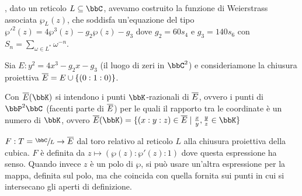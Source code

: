 
, dato un reticolo $L \subseteq \bbC$, avevamo
costruito la funzione di Weierstrass associata $\wp_L (z)$, che soddisfa
un'equazione del tipo $\wp'^2(z) = 4 \wp^3(z) - g_2 \wp(z) - g_3$ dove
$g_2 = 60 s_4$ e $g_3 = 140 s_6$ con $S_n = \sum_{\omega \in L^*}
\omega^{-n}$.

Sia $E: y^2 = 4x^3 - g_2 x - g_3$ (il luogo di zeri in $\bbC^2$) e
consideriamone la chiusura proiettiva $\overline{E} = E \cup \{ (0 : 1 : 0)
\}$.

\begin{notazione}
  Con $\ol{E}(\bbK)$ si intendono i punti $\bbK$-razionali di $\overline{E}$,
  ovvero i punti di $\bbP^2 \bbC$ (facenti parte di $\overline{E}$) per le
  quali il rapporto tra le coordinate è un numero di $\bbK$, ovvero
  $\ol{E}(\bbK) = \{ (x : y : z) \in \ol{E} \mid \frac{x}{y},
  \frac{y}{z} \in \bbK \}$
\end{notazione}

 $F: T = \sfrac{\bbC}{L} \rar \ol{E}$
dal toro relativo al reticolo $L$ alla chiusura proiettiva della
cubica. $F$ è definita da $z \mapsto (\wp(z) : \wp'(z) : 1)$ dove questa
espressione ha senso. Quando invece $z$ è un polo di $\wp$, si può usare
un'altra espressione per la mappa, definita sul polo, ma che coincida
con quella fornita sui punti in cui si intersecano gli aperti di
definizione.


